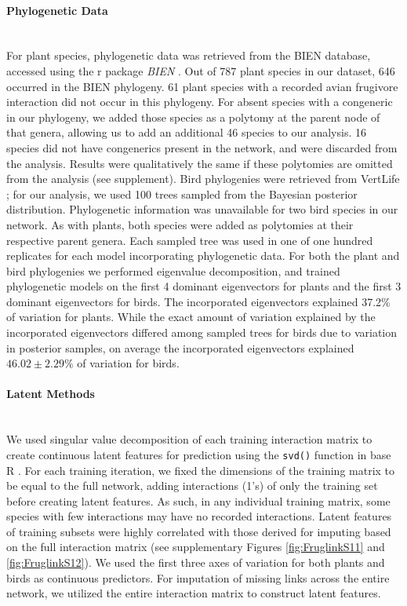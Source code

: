 \paragraph*{Phylogenetic Data}\mbox{}\\
For plant species, phylogenetic data was retrieved from the BIEN database, accessed using the r package \textit{BIEN} \parencite{maitner2018bien}. Out of 787 plant species in our dataset, 646 occurred in the BIEN phylogeny. 61 plant species with a recorded avian frugivore interaction did not occur in this phylogeny. For absent species with a congeneric in our phylogeny, we added those species as a polytomy at the parent node of that genera, allowing us to add an additional 46 species to our analysis. 16 species did not have congenerics present in the network, and were discarded from the analysis. Results were qualitatively the same if these polytomies are omitted from the analysis (see supplement). Bird phylogenies were retrieved from VertLife \parencite{jetz2012}; for our analysis, we used 100 trees sampled from the Bayesian posterior distribution. Phylogenetic information was unavailable for two bird species in our network. As with plants, both species were added as polytomies at their respective parent genera. Each sampled tree was used in one of one hundred replicates for each model incorporating phylogenetic data. For both the plant and bird phylogenies we performed eigenvalue decomposition, and trained phylogenetic models on the first 4 dominant eigenvectors for plants and the first 3 dominant eigenvectors for birds. The incorporated eigenvectors explained 37.2\% of variation for plants. While the exact amount of variation explained by the incorporated eigenvectors differed among sampled trees for birds due to variation in posterior samples, on average the incorporated eigenvectors explained $46.02\pm 2.29\%$ of variation for birds. 

\paragraph*{Latent Methods}\mbox{}\\
We used singular value decomposition of each training interaction matrix to create continuous latent features for prediction using the \texttt{svd()} function in base R \parencite{RCore}. For each training iteration, we fixed the dimensions of the training matrix to be equal to the full network, adding interactions (1's) of only the training set before creating latent features. As such, in any individual training matrix, some species with few interactions may have no recorded interactions. Latent features of training subsets were highly correlated with those derived for imputing based on the full interaction matrix (see supplementary Figures \ref{fig:FruglinkS11} and \ref{fig:FruglinkS12}). We used the first three axes of variation for both plants and birds as continuous predictors. For imputation of missing links across the entire network, we utilized the entire interaction matrix to construct latent features. 


